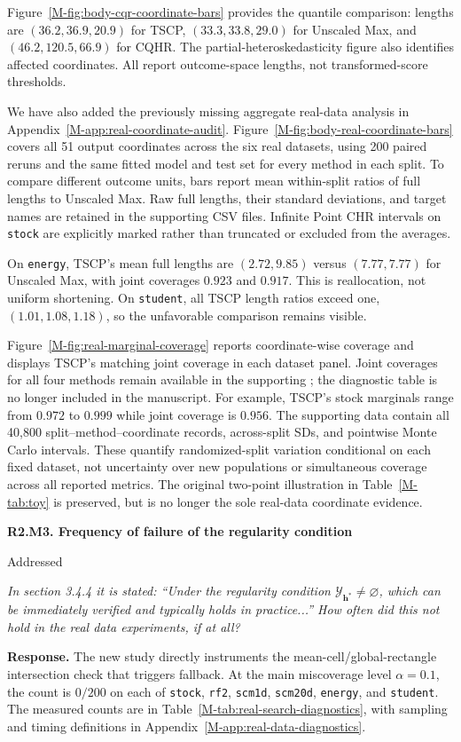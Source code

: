 \documentclass[11pt]{article}
\newcommand{\msapp}[1]{Appendix~\ref*{M-#1}}
\newcommand{\msfig}[1]{Figure~\ref*{M-#1}}
\newcommand{\mstab}[1]{Table~\ref*{M-#1}}
\newcommand{\point}[3]{\par\Needspace{7\baselineskip}\medskip
\noindent\parbox[t]{0.77\linewidth}{\textbf{#1}}\hfill
\parbox[t]{0.21\linewidth}{\raggedleft\small\sffamily #2}\par\nopagebreak
{\color{ReviewerBlue}\small\itshape #3\par}\textbf{Response.} }
\begin{document}
\msfig{fig:body-cqr-coordinate-bars} provides the quantile comparison: lengths are $(36.2,36.9,20.9)$ for TSCP, $(33.3,33.8,29.0)$ for Unscaled Max, and $(46.2,120.5,66.9)$ for CQHR. The partial-heteroskedasticity figure also identifies affected coordinates. All report outcome-space lengths, not transformed-score thresholds.

We have also added the previously missing aggregate real-data analysis in \msapp{app:real-coordinate-audit}. \msfig{fig:body-real-coordinate-bars} covers all 51 output coordinates across the six real datasets, using 200 paired reruns and the same fitted model and test set for every method in each split. To compare different outcome units, bars report mean within-split ratios of full lengths to Unscaled Max. Raw full lengths, their standard deviations, and target names are retained in the supporting CSV files. Infinite Point CHR intervals on \texttt{stock} are explicitly marked rather than truncated or excluded from the averages.

On \texttt{energy}, TSCP's mean full lengths are $(2.72,9.85)$ versus $(7.77,7.77)$ for Unscaled Max, with joint coverages $0.923$ and $0.917$. This is reallocation, not uniform shortening. On \texttt{student}, all TSCP length ratios exceed one, $(1.01,1.08,1.18)$, so the unfavorable comparison remains visible.

\msfig{fig:real-marginal-coverage} reports coordinate-wise coverage and displays TSCP's matching joint coverage in each dataset panel. Joint coverages for all four methods remain available in the supporting ; the diagnostic table is no longer included in the manuscript. For example, TSCP's stock marginals range from $0.972$ to $0.999$ while joint coverage is $0.956$. The supporting data contain all 40,800 split--method--coordinate records, across-split SDs, and pointwise Monte Carlo intervals. These quantify randomized-split variation conditional on each fixed dataset, not uncertainty over new populations or simultaneous coverage across all reported metrics. The original two-point illustration in \mstab{tab:toy} is preserved, but is no longer the sole real-data coordinate evidence.

\point{R2.M3. Frequency of failure of the regularity condition}{Addressed}{In section 3.4.4 it is stated: ``Under the regularity condition
$\mathcal Y_{\bm h^*}\ne\varnothing$, which can be immediately
verified and typically holds in practice...'' How often did this
not hold in the real data experiments, if at all?}
\label{response:R2.M3}
The new study directly instruments the mean-cell/global-rectangle intersection check that triggers fallback. At the main miscoverage level $\alpha=0.1$, the count is $0/200$ on each of \texttt{stock}, \texttt{rf2}, \texttt{scm1d}, \texttt{scm20d}, \texttt{energy}, and \texttt{student}. The measured counts are in \mstab{tab:real-search-diagnostics}, with sampling and timing definitions in \msapp{app:real-data-diagnostics}.
\end{document}
